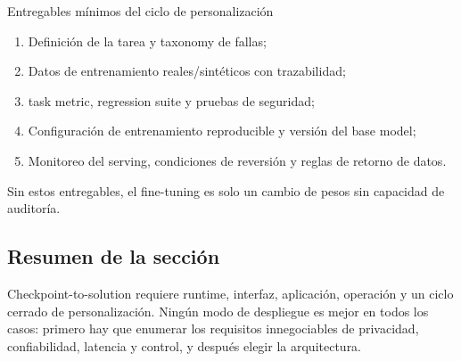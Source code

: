 \begin{importantbox}{Entregables mínimos del ciclo de personalización}
\begin{enumerate}
  \item Definición de la tarea y taxonomy de fallas;
  \item Datos de entrenamiento reales/sintéticos con trazabilidad;
  \item task metric, regression suite y pruebas de seguridad;
  \item Configuración de entrenamiento reproducible y versión del base model;
  \item Monitoreo del serving, condiciones de reversión y reglas de retorno de datos.
\end{enumerate}
Sin estos entregables, el fine-tuning es solo un cambio de pesos sin capacidad de auditoría.
\end{importantbox}


\subsection{Resumen de la sección}

Checkpoint-to-solution requiere runtime, interfaz, aplicación, operación y un ciclo cerrado de personalización. Ningún modo de despliegue es mejor en todos los casos: primero hay que enumerar los requisitos innegociables de privacidad, confiabilidad, latencia y control, y después elegir la arquitectura.
